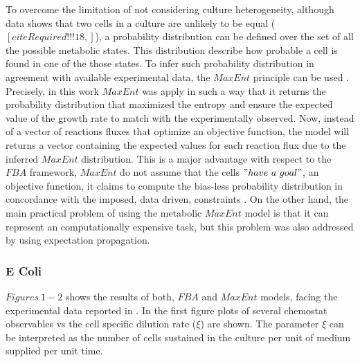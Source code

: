 \documentclass[]{article}
\begin{document}
	To overcome the limitation of not considering culture heterogeneity, although data shows that two cells in a culture are unlikely to be equal ($[citeRequired!!!18, ]$), a probability distribution can be defined over the set of all the possible metabolic states.
	This distribution describe how probable a cell is found in one of the those states.
	To infer such probability distribution in agreement with available experimental data, the $MaxEnt$ principle can be used  . 
	Precisely, in this work $MaxEnt$ was apply in such a way that it returns the probability distribution that maximized the entropy and ensure the expected value of the growth rate to match with the experimentally observed.
	Now, instead of a vector of reactions fluxes that optimize an objective function, the model will returns a vector containing the expected values for each reaction flux due to the inferred $MaxEnt$ distribution. 
	This is a major advantage with respect to the $FBA$ framework, $MaxEnt$ do not assume that the cells $"have\ a\ goal"$, an objective function, it claims to compute the bias-less probability distribution in concordance with the imposed, data driven, constraints . On the other hand, the main practical problem of using the metabolic $MaxEnt$ model is that it can represent an computationally expensive task, but this problem was also addressed by  using expectation propagation.
	
	
	
	\subsubsection{E Coli}
	
	$Figures\ 1-2$ shows the results of both, $FBA$ and $MaxEnt$ models, facing the experimental data reported in . In the first figure plots of several chemostat observables vs the cell specific dilution rate ($\xi$) are shown. The parameter $\xi$ can be interpreted as the number of cells sustained in the culture per unit of medium supplied per unit time. 
	
\end{document}
